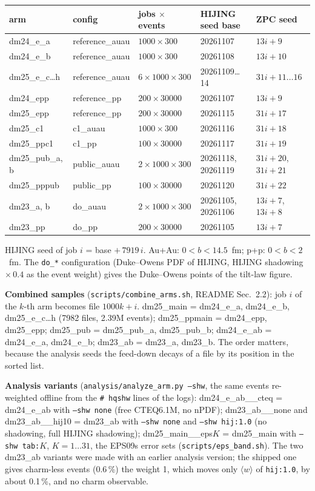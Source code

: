 \documentclass[11pt,a4paper]{article}
\newcommand{\code}[1]{\texttt{#1}}
\begin{document}
\begin{center}\small
\begin{tabular}{@{}lllll@{}}
\toprule arm & config & jobs $\times$ events & HIJING seed base & ZPC seed \\ \midrule
dm24\_e\_a & reference\_auau & $1000\times300$ & 20261107 & $13i+9$ \\
dm24\_e\_b & reference\_auau & $1000\times300$ & 20261108 & $13i+10$ \\
dm25\_e\_c\ldots h & reference\_auau & $6\times1000\times300$ & 20261109\ldots14 & $31i+11\ldots16$ \\
dm24\_epp & reference\_pp & $200\times30000$ & 20261107 & $13i+9$ \\
dm25\_epp & reference\_pp & $200\times30000$ & 20261115 & $31i+17$ \\
dm25\_c1 & c1\_auau & $1000\times300$ & 20261116 & $31i+18$ \\
dm25\_ppc1 & c1\_pp & $100\times30000$ & 20261117 & $31i+19$ \\
dm25\_pub\_a, b & public\_auau & $2\times1000\times300$ & 20261118, 20261119 & $31i+20$, $31i+21$ \\
dm25\_pppub & public\_pp & $100\times30000$ & 20261120 & $31i+22$ \\
dm23\_a, b & do\_auau & $2\times1000\times300$ & 20261105, 20261106 & $13i+7$, $13i+8$ \\
dm23\_pp & do\_pp & $200\times30000$ & 20261105 & $13i+7$ \\
\bottomrule
\end{tabular}
\end{center}
HIJING seed of job $i$ = base $+\,7919\,i$. Au+Au: $0<b<14.5$~fm; p+p: $0<b<2$~fm. The \code{do\_*} configuration
(Duke--Owens PDF of HIJING, HIJING shadowing $\times\,0.4$ as the event weight) gives the Duke--Owens points of the
tilt-law figure.

\textbf{Combined samples} (\code{scripts/combine\_arms.sh}, README Sec.~2.2): job $i$ of the $k$-th arm becomes file
$1000k+i$. dm25\_main = dm24\_e\_a, dm24\_e\_b, dm25\_e\_c\ldots h (7982 files, 2.39M events); dm25\_ppmain = dm24\_epp,
dm25\_epp; dm25\_pub = dm25\_pub\_a, dm25\_pub\_b; dm24\_e\_ab = dm24\_e\_a, dm24\_e\_b; dm23\_ab = dm23\_a, dm23\_b. The
order matters, because the analysis seeds the feed-down decays of a file by its position in the sorted list.

\textbf{Analysis variants} (\code{analysis/analyze\_arm.py --shw}, the same events re-weighted offline from the
\code{\# hqshw} lines of the logs): dm24\_e\_ab\_\_cteq = dm24\_e\_ab with \code{--shw none} (free CTEQ6.1M, no nPDF);
dm23\_ab\_\_none and dm23\_ab\_\_hij10 = dm23\_ab with \code{--shw none} and \code{--shw hij:1.0} (no shadowing, full
HIJING shadowing); dm25\_main\_\_eps$K$ = dm25\_main with \code{--shw tab:$K$}, $K=1\ldots31$, the EPS09s error sets
(\code{scripts/eps\_band.sh}). The two dm23\_ab variants were made with an earlier analysis version; the shipped one
gives charm-less events (0.6\,\%) the weight 1, which moves only $\langle w\rangle$ of \code{hij:1.0}, by about 0.1\,\%,
and no charm observable.
\end{document}
